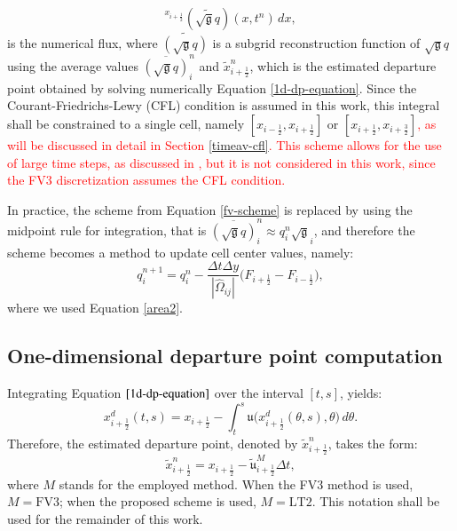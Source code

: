\documentclass[preprint,12pt]{elsarticle}
\begin{document}
\begin{linenumbers}
\begin{equation}
	 ^{x_{i+\frac{1}{2}}}
	 (\widetilde{\sqrt{\mathfrak{g}}{q}})(x, t^n) \,dx,
\end{equation} 
is the numerical flux, where $\widetilde{(\sqrt{\mathfrak{g}}{q})}$ is a subgrid reconstruction function of $\sqrt{\mathfrak{g}}{q}$ using the average values $\overline{(\sqrt{\mathfrak{g}}q)}^{n}_{i}$ and $\tilde{x}_{i+\frac{1}{2}}^n$, which is the estimated departure point obtained by solving numerically Equation \eqref{1d-dp-equation}.
Since the Courant-Friedrichs-Lewy (CFL) condition is assumed in this work, this integral shall be constrained to a single cell, namely $[x_{i-\frac{1}{2}},x_{i+\frac{1}{2}}]$ or $[x_{i+\frac{1}{2}},x_{i+\frac{3}{2}}]$\textcolor{red}{, as will be discussed in detail in Section \ref{timeav-cfl}.
This scheme allows for the use of large time steps, as discussed in \cite{lin:1996,chen:2017}, but it is not considered in this work, since the FV3 discretization assumes the CFL condition.}

In practice, the scheme from Equation \eqref{fv-scheme} is replaced by using the midpoint rule for integration, that is $\overline{(\sqrt{\mathfrak{g}}q)}_{i}^n \approx q_{i}^n\sqrt{\mathfrak{g}}_{i}$, and therefore the scheme becomes a method to update cell center values, namely:
\begin{equation}
	\label{fv-scheme-mdp}
	{q}^{n+1}_{i} = {q}^{n}_{i} - \frac{\Delta t \Delta y}{|\hat{\Omega}_{ij}|}
	\bigg({F}_{i+\frac{1}{2}}-
	{F}_{i-\frac{1}{2}}\bigg),
\end{equation}
where we used Equation \eqref{area2}.

\subsection{One-dimensional departure point computation}
Integrating Equation $\eqref{1d-dp-equation}$ over the interval $[t,s]$, yields:
\begin{equation}
	\label{dp-integral}
	x_{i+\frac{1}{2}}^d(t,s) = x_{i+\frac{1}{2}} - \int_{t}^{s}{\mathfrak{u}}\big( x_{i+\frac{1}{2}}^d(\theta,s), \theta\big) \,d\theta.
\end{equation}
Therefore, the estimated departure point, denoted by $\tilde{x}_{i+\frac{1}{2}}^n$, takes the form:
\begin{equation}
	\label{dp-estimated}
	\tilde{x}_{i+\frac{1}{2}}^n = x_{i+\frac{1}{2}} - {\tilde{\mathfrak{u}}}^{M}_{i+\frac{1}{2}}\Delta t,
\end{equation}
where $M$ stands for the employed method.
When the FV3 method is used, $M=\text{FV3}$; when the proposed scheme is used, $M=\text{LT2}$. This notation shall be used for the remainder of this work.


\end{linenumbers}
\end{document}
